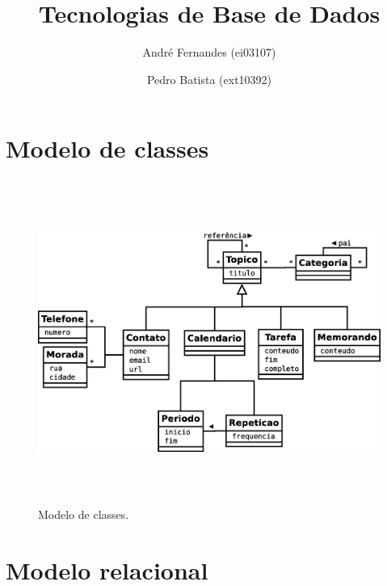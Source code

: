 \documentclass[a4paper,12pt]{article}
\title{Tecnologias de Base de Dados}
\author{André Fernandes (ei03107) \and Pedro Batista (ext10392)}
\begin{document}
\maketitle

\section{Modelo de classes}

	\begin{figure}[htp]
		\begin{center}
			\includegraphics[height=300pt]{uml}
		\end{center}
		\caption{Modelo de classes.}
		\label{fig:uml}
	\end{figure}

\section{Modelo relacional}
\end{document}
